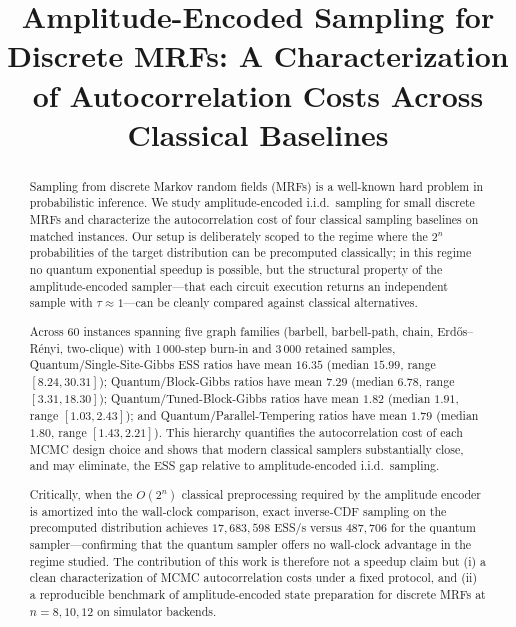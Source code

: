 \documentclass[conference,10pt]{IEEEtran}
\begin{document}
\title{Amplitude-Encoded Sampling for Discrete MRFs: A Characterization of Autocorrelation Costs Across Classical Baselines}

\author{
}

\maketitle

\begin{abstract}
Sampling from discrete Markov random fields (MRFs) is a well-known hard problem in probabilistic inference. We study amplitude-encoded i.i.d.\ sampling for small discrete MRFs and characterize the autocorrelation cost of four classical sampling baselines on matched instances. Our setup is deliberately scoped to the regime where the $2^n$ probabilities of the target distribution can be precomputed classically; in this regime no quantum exponential speedup is possible, but the structural property of the amplitude-encoded sampler---that each circuit execution returns an independent sample with $\tau \approx 1$---can be cleanly compared against classical alternatives.

Across 60 instances spanning five graph families (barbell, barbell-path, chain, Erd\H{o}s--R\'enyi, two-clique) with 1\,000-step burn-in and 3\,000 retained samples, Quantum/Single-Site-Gibbs ESS ratios have mean $16.35$ (median $15.99$, range $[8.24, 30.31]$); Quantum/Block-Gibbs ratios have mean $7.29$ (median $6.78$, range $[3.31, 18.30]$); Quantum/Tuned-Block-Gibbs ratios have mean $1.82$ (median $1.91$, range $[1.03, 2.43]$); and Quantum/Parallel-Tempering ratios have mean $1.79$ (median $1.80$, range $[1.43, 2.21]$). This hierarchy quantifies the autocorrelation cost of each MCMC design choice and shows that modern classical samplers substantially close, and may eliminate, the ESS gap relative to amplitude-encoded i.i.d.\ sampling.

Critically, when the $O(2^n)$ classical preprocessing required by the amplitude encoder is amortized into the wall-clock comparison, exact inverse-CDF sampling on the precomputed distribution achieves $17{,}683{,}598$ ESS/s versus $487{,}706$ for the quantum sampler---confirming that the quantum sampler offers no wall-clock advantage in the regime studied. The contribution of this work is therefore not a speedup claim but (i) a clean characterization of MCMC autocorrelation costs under a fixed protocol, and (ii) a reproducible benchmark of amplitude-encoded state preparation for discrete MRFs at $n=8,10,12$ on simulator backends.


\end{abstract}
\end{document}
